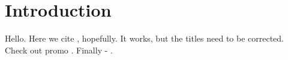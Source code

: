 \chapter*{Introduction}


Hello. Here we cite \citep*{CharlesJ.Geyer}, hopefully. It works, but the titles need to be corrected. Check out promo \citep*{BłażejMiasojedow}. Finally - \citep*{MaximeCrochmore}.